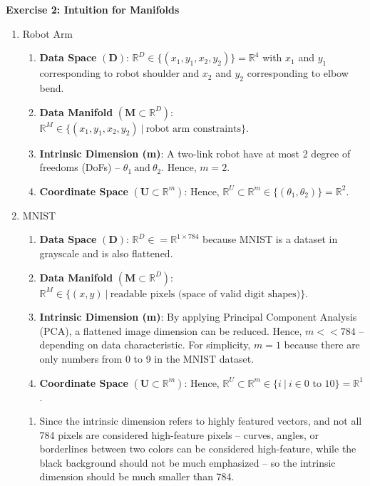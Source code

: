 \documentclass[11pt]{article}
\begin{document}
\noindent
\textbf{Exercise 2: Intuition for Manifolds}

\begin{enumerate}
    \item Robot Arm 
    \begin{enumerate}[label=\roman*.]
        \item \textbf{Data Space} \((\mathbf{D})\): \(\mathbb{R}^D \in \{(x_1, y_1, x_2, y_2)\} = \mathbb{R}^4\) with \(x_1\) and \(y_1\) corresponding to robot shoulder and \(x_2\) and \(y_2\) corresponding to elbow bend. 
        \item \textbf{Data Manifold} \((\mathbf{M} \subset \mathbb{R}^D)\): \(\mathbb{R}^M \in \{(x_1, y_1, x_2, y_2) \ | \ \text{robot arm constraints} \}\). 
        \item  \textbf{Intrinsic Dimension (m)}: A two-link robot have at most 2 degree of freedoms (DoFs) -- \(\theta_1 \ \text{and} \ \theta_2\).
        Hence, \(m = 2\).
        \item \textbf{Coordinate Space} \((\mathbf{U} \subset \mathbb{R}^m)\): Hence, \(\mathbb{R}^U \subset \mathbb{R}^m \in \{(\theta_1, \theta_2)\} = \mathbb{R}^2\).        
    \end{enumerate}

    \item MNIST
    \begin{enumerate}[label=\roman*.]
        \item \textbf{Data Space} \((\mathbf{D})\): \(\mathbb{R}^D \in = \mathbb{R}^{1 \times 784}\) because MNIST is a dataset in grayscale and is also flattened. 
        \item \textbf{Data Manifold} \((\mathbf{M} \subset \mathbb{R}^D)\): \(\mathbb{R}^M \in \{(x, y) \ | \ \text{readable pixels (space of valid digit shapes)} \}\). 
        \item  \textbf{Intrinsic Dimension (m)}: By applying Principal Component Analysis (PCA), a flattened image dimension can be reduced. Hence, \(m << 784\) -- depending on data characteristic.
        For simplicity, \(m = 1\) because there are only numbers from 0 to 9 in the MNIST dataset.
        \item \textbf{Coordinate Space} \((\mathbf{U} \subset \mathbb{R}^m)\): Hence, \(\mathbb{R}^U \subset \mathbb{R}^m \in \{i \ | \ i \in 0 \text{ to } 10 \} = \mathbb{R}^1\).        
    \end{enumerate}

    \begin{enumerate}[label=(\alph*)]
        \item Since the intrinsic dimension refers to highly featured vectors, and not all 784 pixels are considered high-feature pixels -- curves, angles, or borderlines between two colors can be considered high-feature, while the black background should not be much emphasized -- so the intrinsic dimension should be much smaller than 784.
    \end{enumerate}
\end{enumerate}
\end{document}
